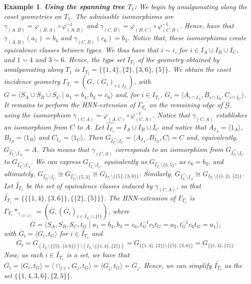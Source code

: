 \documentclass[11pt,letterpaper]{amsart}
\newtheorem{example}[prop]{Example}
\begin{document}
\begin{example}
\textbf{Using the spanning tree $T_1$:} We begin by amalgamating along the coset geometries on $T_1$.
The admissible isomorphisms are $\gamma_{(A,B)}=\varphi_{(B,A)}\circ\varphi_{(A,B)}^{-1}$ and $\gamma_{(C,B)}=\varphi_{(B,C)}\circ\varphi_{(C,B)}^{-1}$. Hence, have that 
$\gamma_{(A,B)}(a_1)=b_4$ and $\gamma_{(C,B)}(c_{6})=b_3$.
Notice that, these isomorphisms create equivalence classes between types. We thus have that $i\sim i$, for $i\in I_A\cup I_B\cup I_C$, and $1\sim 4$ and $3\sim 6$.
Hence, the type set $I_{T_1}$ of the geometry obtained by amalgamating along $T_1$ is $I_{T_1}=\{\{1,4\},\{2\},\{3,6\},\{5\}\}$.
We obtain the coset incidence geometry $\Gamma_{T_1}=(G,(G_i)_{i\in I_{T_1}})$, with $G=\langle S_A\cup S_B\cup S_C \mid  a_1 = b_4, b_3=c_{6}\rangle$ and, for $i\in I_{T_1}$, $G_i=\langle A_{i\cap I_A}, B_{i\cap I_B}, C_{i\cap I_C}\rangle$.
It remains to perform the HNN-extension of $\Gamma_{T_1}$ on the remaining edge of $\mathcal{G}$, using the isomorphism $\gamma_{(C,A)}=\varphi_{(A,C)}\circ\varphi_{(C,A)}^{-1}$. Notice that $\gamma_{(C,A)}$ establishes an isomorphism from $C$ to $A$. Let $\widehat{I_{T_1}}=I_A\cup I_B\cup I_C$ and notice that $A_{I_A}=\langle 1_A\rangle$, $B_{I_B}=\langle 1_B\rangle$ and $C_{I_C}=\langle 1_C\rangle$.
Then $G_{\widehat{I_{T_1}}\setminus I_C}=\langle A_{I_A},B_{I_B}, C\rangle = C$ and, equivalently, $G_{\widehat{I_{T_1}}\setminus I_A} = A$. 
This means that $\gamma_{(C,A)}$
corresponds to an isomorphism from $G_{\widehat{I_{T_1}}\setminus I_C}$ to $G_{\widehat{I_{T_1}}\setminus I_A}$. We can express $G_{\widehat{I_{T_1}}\setminus I_C}$ equivalently as $G_{\widehat{I_{T_1}}\setminus\{3,5\}}$, as $c_{6}=b_3$, and ultimately, $G_{\widehat{I_{T_1}}\setminus I_C}\cong G_{\widehat{I_{T_1}}\setminus\{5,3\}}\cong G_{I_{T_1}\setminus\{\{5\},\{3,6\}\}}$. Similarly, $G_{\widehat{I_{T_1}}\setminus I_A}\cong G_{I_{T_1}\setminus\{\{1,4\},\{2\}\}}$.
Let $\widetilde{I_{T_1}}$ be the set of equivalence classes induced by $\gamma_{(C,A)}$, so that $\widetilde{I_{T_1}}=\{ \{\{1,4\},\{3,6\}\}, \{\{2\},\{5\} \}\}$. 
The HNN-extension of $\Gamma_{T_1}$ is $\Gamma_{T_1}*_{\gamma_{(C,A)}}=(\overline{G},(\overline{G}_i)_{i\in \widetilde{I_{T_1}}\cup\{t\}})$, where $$\overline{G}=\langle S_A, S_B, S_C, t_G\mid  a_1 = b_4, b_3=c_{6}, t_G^{-1}c_{5}t_G=a_2, t_G^{-1}c_{6}t_G=a_1\rangle,$$ with $\overline{G}_i=\langle G_i, t_G\rangle$ for $i\in \widetilde{I_{T_1}}$ and $$\overline{G}_t=G_{(I_{T_1}\setminus\{\{5\},\{3,6\}\})\setminus(I_{T_1}\setminus\{\{1,4\},\{2\}\})}=G_{\{\{1,4\},\{2\}\}\setminus\{\{5\},\{3,6\}\}}=G_{\{\{1,4\},\{2\}\}}.$$
Now, as each $i\in \widetilde{I_{T_1}}$ is a set, we have that $\overline{G}_i = \langle G_i,t_G\rangle = \langle \cap_{j\in i} G_j,t_G\rangle =\langle G_{\widehat{i}}, t_G \rangle =  \overline{G}_{\widehat{i}}$. Hence, we can simplify $\widetilde{I_{T_1}}$ as the set $\{\{1,4,3,6\},\{2,5\}\}$.


\end{example}
\end{document}
